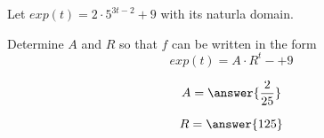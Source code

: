 \documentclass{ximera}
\author{Lee Wayand}
\begin{document}
\begin{exercise}




Let $exp(t) = 2 \cdot 5^{3t-2} + 9$ with its naturla domain.


\begin{question}


Determine $A$ and $R$ so that $f$ can be written in the form 
\[
exp(t) = A \cdot R^t -+ 9
\]



\[
A = \answer{\frac{2}{25}}
\]


\[
R = \answer{125}
\]


\end{question}















\end{exercise}
\end{document}
